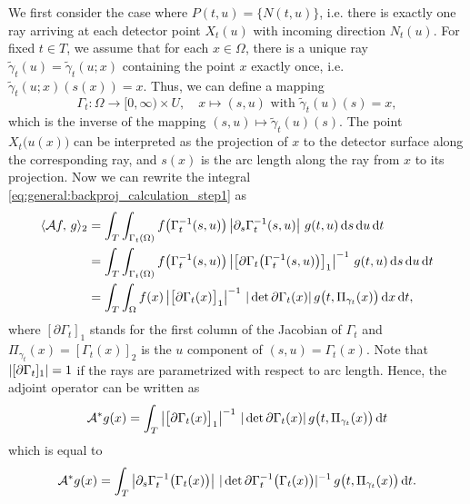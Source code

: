 \documentclass{amsart}
\begin{document}
%
We first consider the case where $P(t,u) = \lbrace N(t,u)\rbrace$, i.e. there is exactly one ray arriving at each detector point 
$X_t(u)$ with incoming direction $N_t(u)$. For fixed $t \in T$, we assume that for each $x \in \Omega$, there is a unique ray 
$\tilde \gamma_t(u) = \tilde \gamma_t(u; x)$ containing the point $x$ exactly once, i.e. $\tilde \gamma_t(u; x)(s(x)) = x$. Thus, we can 
define a 
mapping
%
\begin{equation*}
 \Gamma_t: \Omega \to [0, \infty) \times U,\quad x \mapsto (s, u) \text{ with } \tilde \gamma_t(u)(s) = x,
\end{equation*}
%
which is the inverse of the mapping $(s,u) \mapsto \tilde \gamma_t(u)(s)$. The point $X_t\big(u(x)\big)$ can be interpreted as the 
projection of 
$x$ to the detector surface along the corresponding ray, and $s(x)$ is the arc length along the ray from $x$ to its projection. 
Now we can rewrite the integral \eqref{eq:general:backproj_calculation_step1} as
%
\begin{align*}
 \langle {\ensuremath{\mathcal{A}}} f,\,g\rangle_2
 &= \int_T \int_{\Gamma_t(\Omega)} f\big(\Gamma_t^{-1}(s,u)\big) \left| \partial_s \Gamma_t^{-1}(s,u) \right|\, g(t, u)\, \mathrm{d} s\, \mathrm{d} u\, 
 \mathrm{d} t  \\
 &= \int_T \int_{\Gamma_t(\Omega)} f\big(\Gamma_t^{-1}(s,u)\big) \left| \big[\partial \Gamma_t\big(\Gamma_t^{-1}(s,u)\big)\big]_1 \right|^{-1}\, 
 g(t, u)\, \mathrm{d}  s\, \mathrm{d} u\, \mathrm{d} t \\
 &= \int_T \int_\Omega f(x) \left| \big[\partial \Gamma_t(x)\big]_1 \right|^{-1}\, |\operatorname*{det}{\partial \Gamma_t(x)}|\, 
 g\big(t, \Pi_{\gamma_t}(x)\big)
 \, \mathrm{d} x\, \mathrm{d} t,
\end{align*}
%
where $[\partial \Gamma_t]_1$ stands for the first column of the Jacobian of $\Gamma_t$ and $\Pi_{\gamma_t}(x) = [\Gamma_t(x)]_2$ is the 
$u$ component of $(s, u) = \Gamma_t(x)$. Note that $|[\partial \Gamma_t]_1| = 1$ if the rays are parametrized with respect to arc 
length. Hence, the adjoint operator can be written as
%
\begin{equation}
 \label{eq:general:backproj_onedir}
 {\ensuremath{{\mathcal{A}}^*}} g(x) = \int_T \left| \big[\partial \Gamma_t(x)\big]_1 \right|^{-1}\, |\operatorname*{det}{\partial \Gamma_t(x)}|\, g\big(t, 
\Pi_{\gamma_t}(x)\big)\, 
 \mathrm{d} t
\end{equation}
%
which is equal to
%
\begin{equation}
 \label{eq:general:backproj_onedir_alt}
 {\ensuremath{{\mathcal{A}}^*}} g(x) = \int_T \left| \partial_s \Gamma_t^{-1}\big(\Gamma_t(x)\big) \right|\, 
 |\operatorname*{det}{\partial \Gamma_t^{-1}\big(\Gamma_t(x)\big)}|^{-1}\, g\big(t, \Pi_{\gamma_t}(x)\big)\, \mathrm{d} t.
\end{equation}
\end{document}

